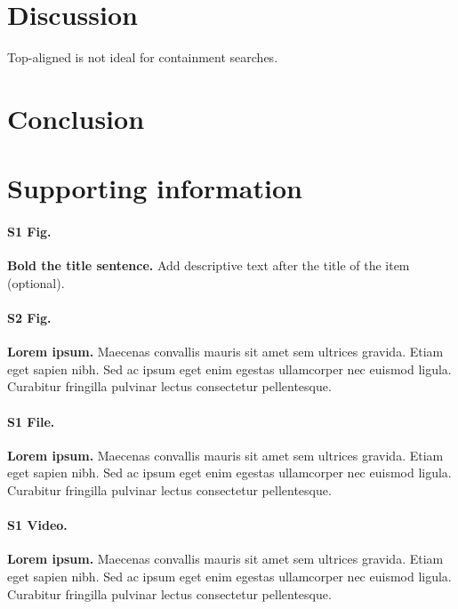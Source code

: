 \documentclass[10pt,letterpaper]{article}
\begin{document}
\section*{Discussion}

Top-aligned is not ideal for containment searches. 


\section*{Conclusion}


\section*{Supporting information}

\paragraph*{S1 Fig.}
\label{S1_Fig}
{\bf Bold the title sentence.} Add descriptive text after the title of the item (optional).

\paragraph*{S2 Fig.}
\label{S2_Fig}
{\bf Lorem ipsum.} Maecenas convallis mauris sit amet sem ultrices gravida. Etiam eget sapien nibh. Sed ac ipsum eget enim egestas ullamcorper nec euismod ligula. Curabitur fringilla pulvinar lectus consectetur pellentesque.

\paragraph*{S1 File.}
\label{S1_File}
{\bf Lorem ipsum.}  Maecenas convallis mauris sit amet sem ultrices gravida. Etiam eget sapien nibh. Sed ac ipsum eget enim egestas ullamcorper nec euismod ligula. Curabitur fringilla pulvinar lectus consectetur pellentesque.

\paragraph*{S1 Video.}
\label{S1_Video}
{\bf Lorem ipsum.}  Maecenas convallis mauris sit amet sem ultrices gravida. Etiam eget sapien nibh. Sed ac ipsum eget enim egestas ullamcorper nec euismod ligula. Curabitur fringilla pulvinar lectus consectetur pellentesque.
\end{document}
